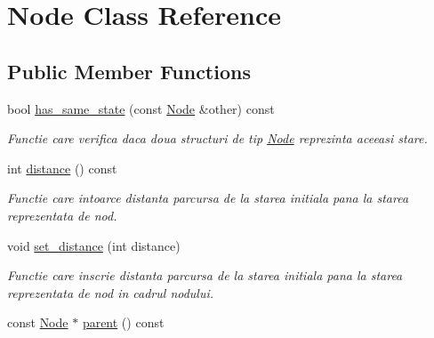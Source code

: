 \hypertarget{classNode}{
\section{Node Class Reference}
\label{classNode}
}
\subsection*{Public Member Functions}
\begin{DoxyCompactItemize}
\item 
\hypertarget{classNode_a04535ea56222fb056ac3f9cdb2b0e9dc}{
bool \hyperlink{classNode_a04535ea56222fb056ac3f9cdb2b0e9dc}{has\_\-same\_\-state} (const \hyperlink{classNode}{Node} \&other) const }
\label{classNode_a04535ea56222fb056ac3f9cdb2b0e9dc}

\begin{DoxyCompactList}\small\item\em Functie care verifica daca doua structuri de tip \hyperlink{classNode}{Node} reprezinta aceeasi stare. \item\end{DoxyCompactList}\item 
\hypertarget{classNode_a7f6a233887089a7088a7cff703923e35}{
int \hyperlink{classNode_a7f6a233887089a7088a7cff703923e35}{distance} () const }
\label{classNode_a7f6a233887089a7088a7cff703923e35}

\begin{DoxyCompactList}\small\item\em Functie care intoarce distanta parcursa de la starea initiala pana la starea reprezentata de nod. \item\end{DoxyCompactList}\item 
\hypertarget{classNode_a9538475d28df6250d4b3bb383e2c638a}{
void \hyperlink{classNode_a9538475d28df6250d4b3bb383e2c638a}{set\_\-distance} (int distance)}
\label{classNode_a9538475d28df6250d4b3bb383e2c638a}

\begin{DoxyCompactList}\small\item\em Functie care inscrie distanta parcursa de la starea initiala pana la starea reprezentata de nod in cadrul nodului. \item\end{DoxyCompactList}\item 
\hypertarget{classNode_a0dd99341f384d0cbe602792b4aac82ba}{
const \hyperlink{classNode}{Node} $\ast$ \hyperlink{classNode_a0dd99341f384d0cbe602792b4aac82ba}{parent} () const }
\label{classNode_a0dd99341f384d0cbe602792b4aac82ba}


\end{DoxyCompactItemize}
